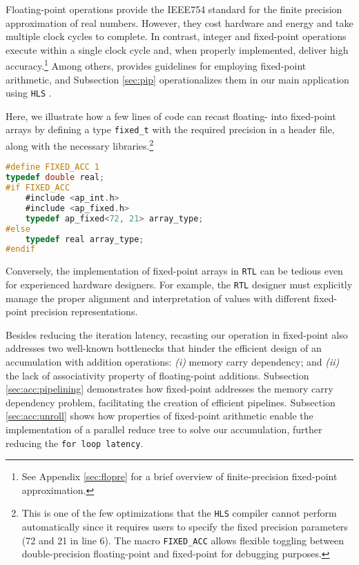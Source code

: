 \documentclass[12pt,american]{article}
\begin{document}
Floating-point operations provide the IEEE754 standard for the finite precision approximation of real numbers. However, they cost hardware and energy and take multiple clock cycles to complete. In contrast, integer and fixed-point operations execute within a single clock cycle and, when properly implemented, deliver high accuracy.\footnote{See Appendix \ref{sec:flopre} for a brief overview of finite-precision fixed-point approximation.} Among others, \citet{yates2009fixed} provides guidelines for employing fixed-point arithmetic, and Subsection \ref{sec:pip} operationalizes them in our main application using \texttt{HLS} \citep{vitis-hls-ug1399}. 

Here, we illustrate how a few lines of code can recast floating- into fixed-point arrays by defining a type \texttt{fixed\_t} with the required precision in a header file, along with the necessary libraries.\footnote{This is one of the few optimizations that the \texttt{HLS} compiler cannot perform automatically since it requires users to specify the fixed precision parameters (72 and 21 in line 6). The macro \texttt{FIXED\_ACC} allows flexible toggling between double-precision floating-point and fixed-point for debugging purposes.}

\begin{lstlisting}[language=C,basicstyle=\footnotesize]
#define FIXED_ACC 1   
typedef double real;
#if FIXED_ACC
    #include <ap_int.h>
    #include <ap_fixed.h>
    typedef ap_fixed<72, 21> array_type;	
#else
    typedef real array_type;	
#endif
\end{lstlisting}

Conversely, the implementation of fixed-point arrays in \texttt{RTL} can be tedious even for experienced hardware designers. For example, the \texttt{RTL} designer must explicitly manage the proper alignment and interpretation of values with different fixed-point precision representations.

Besides reducing the iteration latency, recasting our operation in fixed-point also addresses two well-known bottlenecks that hinder the efficient design of an accumulation with addition operations: \textit{(i)} memory carry dependency; and \textit{(ii)} the lack of associativity property of floating-point additions. Subsection \ref{sec:acc:pipelining} demonstrates how fixed-point addresses the memory carry dependency problem, facilitating the creation of efficient pipelines. Subsection \ref{sec:acc:unroll} shows how properties of fixed-point arithmetic enable the implementation of a parallel reduce tree to solve our accumulation, further reducing the \texttt{for loop latency}.
\end{document}

